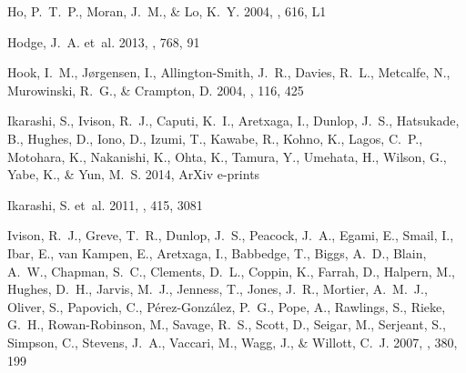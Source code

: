 \documentclass[iop]{emulateapj}
\begin{document}
\begin{thebibliography}{106}
{Ho}, P.~T.~P., {Moran}, J.~M., \& {Lo}, K.~Y. 2004, \apjl, 616, L1

{Hodge}, J.~A. {et~al.} 2013, \apj, 768, 91

{Hook}, I.~M., {J{\o}rgensen}, I., {Allington-Smith}, J.~R., {Davies}, R.~L.,
  {Metcalfe}, N., {Murowinski}, R.~G., \& {Crampton}, D. 2004, \pasp, 116, 425

{Ikarashi}, S., {Ivison}, R.~J., {Caputi}, K.~I., {Aretxaga}, I., {Dunlop},
  J.~S., {Hatsukade}, B., {Hughes}, D., {Iono}, D., {Izumi}, T., {Kawabe}, R.,
  {Kohno}, K., {Lagos}, C.~P., {Motohara}, K., {Nakanishi}, K., {Ohta}, K.,
  {Tamura}, Y., {Umehata}, H., {Wilson}, G., {Yabe}, K., \& {Yun}, M.~S. 2014,
  ArXiv e-prints

{Ikarashi}, S. {et~al.} 2011, \mnras, 415, 3081

{Ivison}, R.~J., {Greve}, T.~R., {Dunlop}, J.~S., {Peacock}, J.~A., {Egami},
  E., {Smail}, I., {Ibar}, E., {van Kampen}, E., {Aretxaga}, I., {Babbedge},
  T., {Biggs}, A.~D., {Blain}, A.~W., {Chapman}, S.~C., {Clements}, D.~L.,
  {Coppin}, K., {Farrah}, D., {Halpern}, M., {Hughes}, D.~H., {Jarvis}, M.~J.,
  {Jenness}, T., {Jones}, J.~R., {Mortier}, A.~M.~J., {Oliver}, S., {Papovich},
  C., {P{\'e}rez-Gonz{\'a}lez}, P.~G., {Pope}, A., {Rawlings}, S., {Rieke},
  G.~H., {Rowan-Robinson}, M., {Savage}, R.~S., {Scott}, D., {Seigar}, M.,
  {Serjeant}, S., {Simpson}, C., {Stevens}, J.~A., {Vaccari}, M., {Wagg}, J.,
  \& {Willott}, C.~J. 2007, \mnras, 380, 199


\end{thebibliography}
\end{document}
